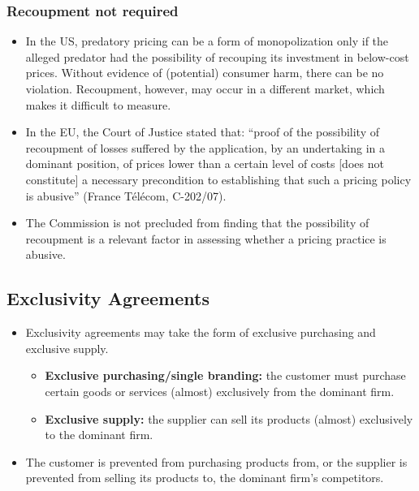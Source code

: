         \subsubsection{Recoupment not required}

            \begin{itemize}
                \item In the US, predatory pricing can be a form of monopolization only if the alleged predator had the possibility of recouping its investment in below-cost prices. Without evidence of (potential) consumer harm, there can be no violation. Recoupment, however, may occur in a different market, which makes it difficult to measure.
                \item In the EU, the Court of Justice stated that: “proof of the possibility of recoupment of losses suffered by the application, by an undertaking in a dominant position, of prices lower than a certain level of costs [does not constitute] a necessary precondition to establishing that such a pricing policy is abusive” (France Télécom, C-202/07).
                \item The Commission is not precluded from finding that the possibility of recoupment is a relevant factor in assessing whether a pricing practice is abusive.
            \end{itemize}
        
    \subsection{Exclusivity Agreements}

        \begin{itemize}
            \item Exclusivity agreements may take the form of exclusive purchasing and exclusive supply.
            \begin{itemize}
                \item \textbf{Exclusive purchasing/single branding:} the customer must purchase certain goods or services (almost) exclusively from the dominant firm.
                \item \textbf{Exclusive supply:} the supplier can sell its products (almost) exclusively to the dominant firm.
            \end{itemize}
            \item The customer is prevented from purchasing products from, or the supplier is prevented from selling its products to, the dominant firm’s competitors.
        \end{itemize}

